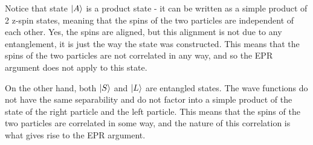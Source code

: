 Notice that state $\ket{A}$ is a product state - it can be written as a simple
product of 2 z-spin states, meaning that the spins of the 
two particles are independent of each other. Yes, the spins are aligned, but 
this alignment is not due to any entanglement, it is just the way the state was
constructed. This means that the spins of the two particles are not correlated
in any way, and so the EPR argument does not apply to this state.

On the other hand, both $\ket{S}$ and $\ket{L}$ are entangled states. The wave 
functions do not have the same separability and do not factor into a simple 
product of the state of the right particle and the left particle. This means
that the spins of the two particles are correlated in some way, and the nature
of this correlation is what gives rise to the EPR argument.
